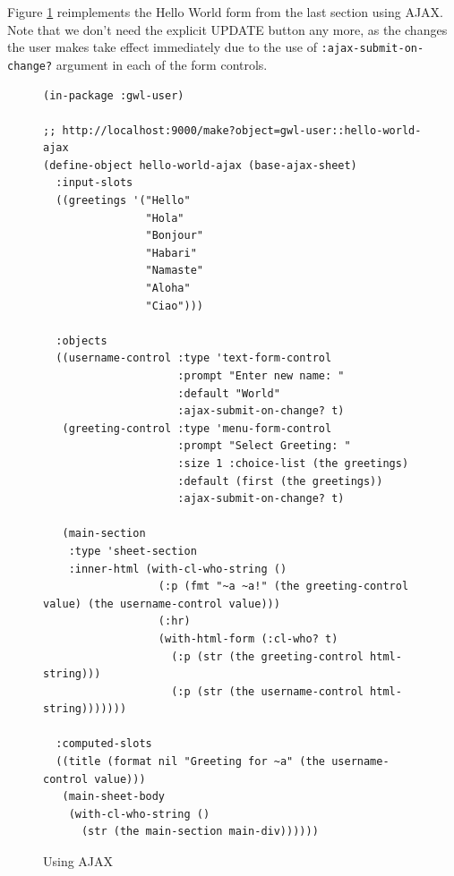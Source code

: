 \documentclass [11pt]{book}
\begin{document}
Figure 
\ref{fig:gwl-hello-world-ajax} reimplements the Hello World form from the last section
using AJAX.  Note that we don't need the explicit UPDATE button any more, as the changes the user makes take effect
immediately due to the use of \texttt{:ajax-submit-on-change?} argument in each of the form controls.
\begin{figure}
\begin{lrbox}{\boxedverb}
\begin{minipage}{\linewidth}
{\small

\begin{verbatim}(in-package :gwl-user)

;; http://localhost:9000/make?object=gwl-user::hello-world-ajax
(define-object hello-world-ajax (base-ajax-sheet)
  :input-slots
  ((greetings '("Hello"
                "Hola"
                "Bonjour"
                "Habari"
                "Namaste"
                "Aloha"
                "Ciao")))

  :objects
  ((username-control :type 'text-form-control
                     :prompt "Enter new name: "
                     :default "World"
                     :ajax-submit-on-change? t)
   (greeting-control :type 'menu-form-control
                     :prompt "Select Greeting: "
                     :size 1 :choice-list (the greetings)
                     :default (first (the greetings))
                     :ajax-submit-on-change? t)

   (main-section
    :type 'sheet-section
    :inner-html (with-cl-who-string ()
                  (:p (fmt "~a ~a!" (the greeting-control value) (the username-control value)))
                  (:hr)
                  (with-html-form (:cl-who? t)
                    (:p (str (the greeting-control html-string)))
                    (:p (str (the username-control html-string)))))))

  :computed-slots
  ((title (format nil "Greeting for ~a" (the username-control value)))
   (main-sheet-body
    (with-cl-who-string ()
      (str (the main-section main-div))))))

\end{verbatim}}
\end{minipage}
\end{lrbox}
\fbox{\usebox{\boxedverb}}

\caption{Using AJAX}

\label{fig:gwl-hello-world-ajax}

\end{figure}
\end{document}
